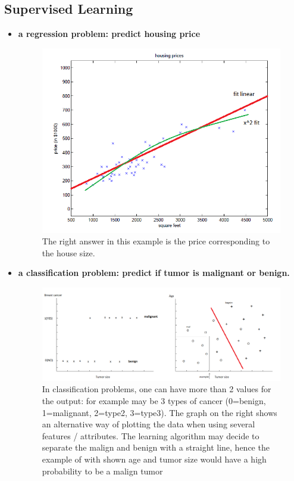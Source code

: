 \documentclass[a4paper,12pt]{report}
\begin{document}
\subsection{Supervised Learning}
\begin{itemize}  
\item \textbf{a regression problem: predict housing price }
\begin{figure}[H]
\centering
        \includegraphics[totalheight=4 cm]{housingData.png}
						\caption{
								\label{housingData} The right answer in this example is the price corresponding to the house size. }
\end{figure}

\item \textbf{a classification problem: predict if tumor is malignant or benign. }
\begin{figure}[H]
\centering
        \includegraphics[totalheight=4 cm]{breastCancer.png}
						\caption{
								\label{breastcancer} In classification problems, one can have more than 2 values for the output: for example may be 3 types of cancer (0=benign, 1=malignant, 2=type2, 3=type3). The graph on the right shows an alternative way of plotting  the data when using several features / attributes. The learning algorithm may decide to separate the malign and benign with a straight line, hence the example of with shown age and tumor size would have a high probability to be a malign tumor }
\end{figure}

\end{itemize}
\end{document}
